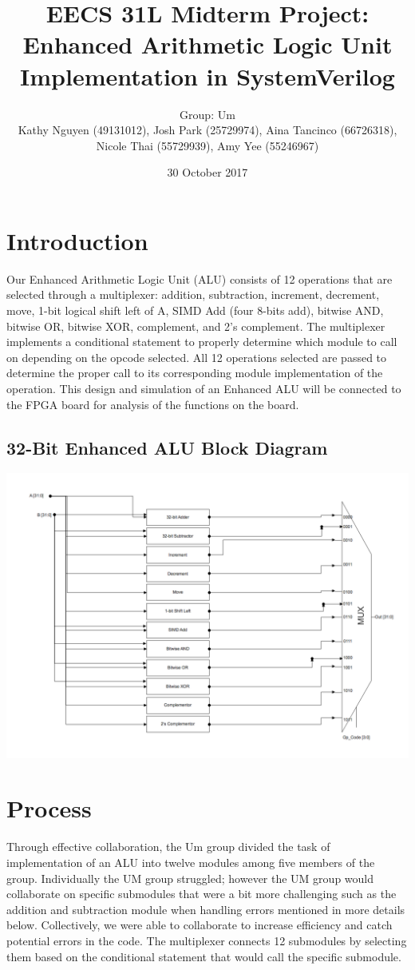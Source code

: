 \documentclass{article}
\title{EECS 31L Midterm Project: \\ Enhanced Arithmetic Logic Unit Implementation in SystemVerilog}
\author{Group: Um \\ Kathy Nguyen (49131012), Josh Park (25729974), Aina Tancinco (66726318),\\ Nicole Thai (55729939), Amy Yee (55246967) }
\date{30 October 2017}
\begin{document}
\maketitle

\section{Introduction}

Our Enhanced Arithmetic Logic Unit (ALU) consists of 12 operations that are selected through a multiplexer: addition, subtraction, increment, decrement, move, 1-bit logical shift left of A, SIMD Add (four 8-bits add), bitwise AND, bitwise OR, bitwise XOR, complement, and 2's complement. The multiplexer implements a conditional statement to properly determine which module to call on depending on the opcode selected. All 12 operations selected are passed to determine the proper call to its corresponding module implementation of the operation. This design and simulation of an Enhanced ALU will be connected to the FPGA board for analysis of the functions on the board.

\subsection{32-Bit Enhanced ALU Block Diagram}
\includegraphics[scale=.5]{photos/ALUBlockDiagram} 
\break

\section{Process}
Through effective collaboration, the Um group divided the task of implementation of an ALU into twelve modules among five members of the group. Individually the UM group struggled; however the UM group would collaborate on specific submodules that were a bit more challenging such as the addition and subtraction module when handling errors mentioned in more details below. Collectively, we were able to collaborate to increase efficiency and catch potential errors in the code. The multiplexer connects 12 submodules by selecting them based on the conditional statement that would call the specific submodule.
\end{document}
